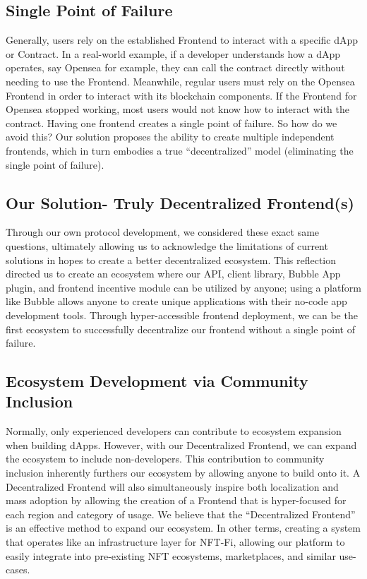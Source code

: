 \documentclass[dvipdfmx]{jsarticle}
\begin{document}
\subsection{Single Point of Failure}
Generally, users rely on the established Frontend to interact with a specific dApp or Contract. 
In a real-world example, if a developer understands how a dApp operates, say Opensea for example, they can call the contract directly without needing to use the Frontend. 
Meanwhile, regular users must rely on the Opensea Frontend in order to interact with its blockchain components. 
If the Frontend for Opensea stopped working, most users would not know how to interact with the contract. 
Having one frontend creates a single point of failure. 
So how do we avoid this? Our solution proposes the ability to create multiple independent frontends, which in turn embodies a true “decentralized” model (eliminating the single point of failure).

\subsection{Our Solution- Truly Decentralized Frontend(s)}
Through our own protocol development, we considered these exact same questions, ultimately allowing us to acknowledge the limitations of current solutions in hopes to create a better decentralized ecosystem.
This reflection directed us to create an ecosystem where our API, client library, Bubble App plugin, and frontend incentive module can be utilized by anyone; using a platform like Bubble allows anyone to create unique applications with their no-code app development tools. 
Through hyper-accessible frontend deployment, we can be the first ecosystem to successfully decentralize our frontend without a single point of failure.

\subsection{Ecosystem Development via Community Inclusion}
Normally, only experienced developers can contribute to ecosystem expansion when building dApps. 
However, with our Decentralized Frontend, we can expand the ecosystem to include non-developers. 
This contribution to community inclusion inherently furthers our ecosystem by allowing anyone to build onto it. 
A Decentralized Frontend will also simultaneously inspire both localization and mass adoption by allowing the creation of a Frontend that is hyper-focused for each region and category of usage.
We believe that the “Decentralized Frontend” is an effective method to expand our ecosystem. 
In other terms, creating a system that operates like an infrastructure layer for NFT-Fi, allowing our platform to easily integrate into pre-existing NFT ecosystems, marketplaces, and similar use-cases.
\end{document}
